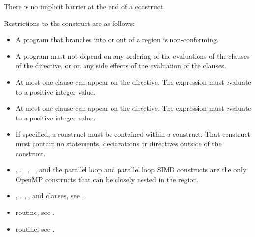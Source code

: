 There is no implicit barrier at the end of a  construct.

\restrictions
Restrictions to the  construct are as follows:

\begin{itemize}
\item A program that branches into or out of a  region is non-conforming.

\item A program must not depend on any ordering of the evaluations of the clauses of the 
 directive, or on any side effects of the evaluation of the clauses.

\item At most one  clause can appear on the directive. The 
 expression must evaluate to a positive integer value.

\item At most one  clause can appear on the directive. The 
expression must evaluate to a positive integer value.

\item If specified, a  construct must be contained within a  construct. That  construct must contain no statements, declarations or directives outside of the  construct.

\item {}, , ~, ~, 
and the parallel loop and parallel loop SIMD constructs are the only OpenMP 
constructs that can be closely nested in the  region. 
\end{itemize}

\crossreferences
\begin{itemize}

\item {}, , , , and  clauses, see 
.

\item {} routine, see 
.

\item {} routine, see 
.
\end{itemize}









